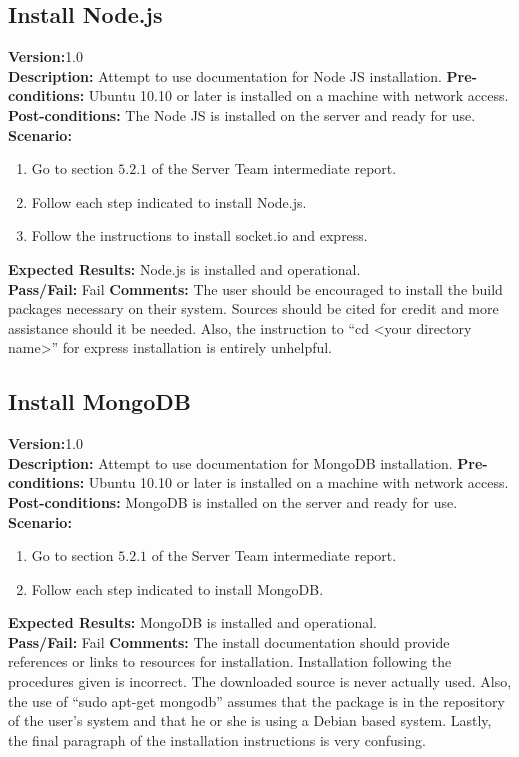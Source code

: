 \documentclass[12pt]{article}
\begin{document}
\subsection{Install Node.js}
\textbf{Version:}1.0\\
\textbf{Description:} Attempt to use documentation for Node JS installation.
\textbf{Pre-conditions:} Ubuntu 10.10 or later is installed on a machine with network access.\\
\textbf{Post-conditions:} The Node JS is installed on the server and ready for use.
\textbf{Scenario:}
\begin{enumerate}
 \item Go to section $5.2.1$ of the Server Team intermediate report.
 \item Follow each step indicated to install Node.js.
 \item Follow the instructions to install socket.io and express.
\end{enumerate}
\textbf{Expected Results:} Node.js is installed and operational.\\
\textbf{Pass/Fail:} Fail
\textbf{Comments:} The user should be encouraged to install the build packages necessary on their system.  Sources should be cited for credit and more assistance should it be needed.  Also, the instruction to “cd <your directory name>” for express installation is entirely unhelpful.  \\

\subsection{Install MongoDB}
\textbf{Version:}1.0\\
\textbf{Description:} Attempt to use documentation for MongoDB installation.
\textbf{Pre-conditions:} Ubuntu 10.10 or later is installed on a machine with network access.\\
\textbf{Post-conditions:} MongoDB is installed on the server and ready for use.
\textbf{Scenario:}
\begin{enumerate}
 \item Go to section $5.2.1$ of the Server Team intermediate report.
 \item Follow each step indicated to install MongoDB.
\end{enumerate}
\textbf{Expected Results:} MongoDB is installed and operational.\\
\textbf{Pass/Fail:} Fail
\textbf{Comments:} The install documentation should provide references or links to resources for installation.  Installation following the procedures given is incorrect.  The downloaded source is never actually used.  Also, the use of “sudo apt-get mongodb” assumes that the package is in the repository of the user’s system and that he or she is using a Debian based system.  Lastly, the final paragraph of the installation instructions is very confusing.
\end{document}

